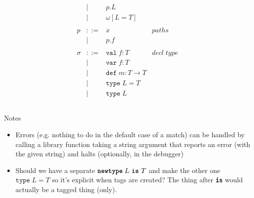 \documentclass{article}
\newcommand{\keyw}[1]{\texttt{\textbf{#1}}}
\begin{document}
\[\begin{array}{lll}
\begin{array}{lllr}
& | & p.L &\\
& | & \omega[L=T] &\\
&&\\
p & ::= & x & paths \\
& | & p.f &\\
&&\\
\sigma & ::= & \texttt{val} \; f:T & decl \; type\\
       & |   & \texttt{var} \; f:T \\
       & |   & \texttt{def} \; m:T \rightarrow T \\
       & |   & \texttt{type} \; L = T &\\
       & |   & \texttt{type} \; L &\\
&&\\
\end{array}
\end{array}
\]

Notes

\begin{itemize}

\item Errors (e.g. nothing to do in the default case of a match) can be handled by calling a library function taking a string argument that reports an error (with the given string) and halts (optionally, in the debugger)

\item Should we have a separate $\keyw{newtype} \; L~\keyw{is}~T$ and make the other one $\texttt{type} \; L = T$ so it's explicit when tags are created?  The thing after \keyw{is} would actually be a tagged thing (only).
\end{itemize}




\end{document}
